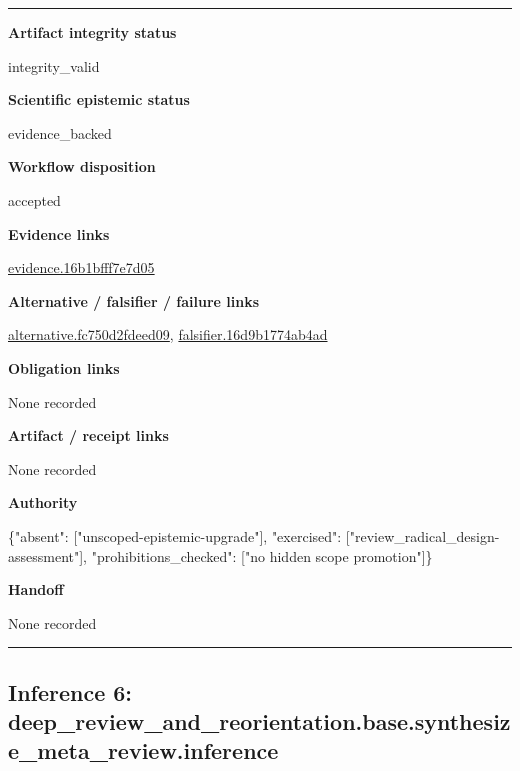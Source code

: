 \documentclass[10pt,a4paper]{article}
\newcommand{\TraceField}[2]{\par\noindent\textbf{#1}\par\noindent #2\par\smallskip}
\newenvironment{TraceDossier}{\par\medskip\noindent\hrule\medskip}{\medskip\hrule\par\medskip}
\begin{document}
\begin{TraceDossier}
\TraceField{Artifact integrity status}{integrity\_\allowbreak{}valid}

\TraceField{Scientific epistemic status}{evidence\_\allowbreak{}backed}

\TraceField{Workflow disposition}{accepted}

\TraceField{Evidence links}{\hyperlink{trace-evidence-1d03bd8957d036392d}{evidence.\allowbreak{}16b1bfff7e\allowbreak{}7d05}}

\TraceField{Alternative / falsifier / failure links}{\hyperlink{trace-alternative-a21ea4142b29edb0a9}{alternativ\allowbreak{}e.\allowbreak{}fc750d2fde\allowbreak{}ed09}, \hyperlink{trace-alternative-a9191edec229a0f6d6}{falsifier.\allowbreak{}16d9b1774a\allowbreak{}b4ad}}

\TraceField{Obligation links}{None recorded}

\TraceField{Artifact / receipt links}{None recorded}

\TraceField{Authority}{\{"absent":\allowbreak{} ["unscoped\allowbreak{}-\allowbreak{}epistemic-\allowbreak{}upgrade"],\allowbreak{} "exercised\allowbreak{}":\allowbreak{} ["review\_\allowbreak{}radical\_\allowbreak{}design-\allowbreak{}assessment\allowbreak{}"], "prohibiti\allowbreak{}ons\_\allowbreak{}checked":\allowbreak{} ["no hidden scope promotion"\allowbreak{}]\}}

\TraceField{Handoff}{None recorded}

\end{TraceDossier}
\pagebreak[2]\subsection{Inference 6: deep\_\allowbreak{}review\_\allowbreak{}and\_\allowbreak{}reorientat\allowbreak{}ion.\allowbreak{}base.\allowbreak{}synthesize\allowbreak{}\_\allowbreak{}meta\_\allowbreak{}review.\allowbreak{}inference}\label{trace-inference-7f5affa82508c993ae}
\end{document}
